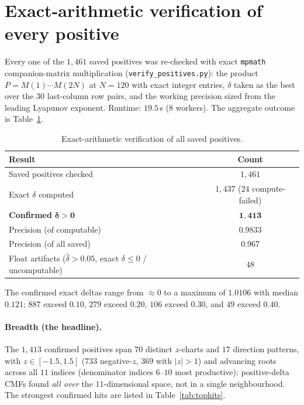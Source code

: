 \documentclass[11pt,a4paper]{article}
\theoremstyle{definition}
\newcommand{\dhat}{\hat{\delta}}
\begin{document}
\section{Exact-arithmetic verification of every positive}
\label{sec:exact}
Every one of the $1{,}461$ saved positives was re-checked with exact \texttt{mpmath}
companion-matrix multiplication (\texttt{verify\_positives.py}): the product
$P=M(1)\cdots M(2N)$ at $N=120$ with exact integer entries, $\delta$ taken as the best over the
$30$ last-column row pairs, and the working precision sized from the leading Lyapunov exponent.
Runtime: $19.5$\,s ($8$ workers). The aggregate outcome is Table~\ref{tab:verify}.

\begin{table}[t]\centering
\caption{Exact-arithmetic verification of all saved positives.}
\label{tab:verify}
\begin{tabular}{lc}
\toprule
Result & Count \\
\midrule
Saved positives checked & $1{,}461$ \\
Exact $\delta$ computed & $1{,}437$ ($24$ compute-failed) \\
\textbf{Confirmed }$\boldsymbol{\delta>0}$ & $\mathbf{1{,}413}$ \\
Precision (of computable) & $\mathbf{0.9833}$ \\
Precision (of all saved) & $0.967$ \\
Float artifacts ($\dhat>0.05$, exact $\delta\le0$ / uncomputable) & $48$ \\
\bottomrule
\end{tabular}
\end{table}

The confirmed exact deltas range from ${\approx}0$ to a maximum of $1.0106$ with median
$0.121$; $887$ exceed $0.10$, $279$ exceed $0.20$, $106$ exceed $0.30$, and $49$ exceed $0.40$.
\paragraph{Breadth (the headline).} The $1{,}413$ confirmed positives span $70$ distinct
$z$-charts and $17$ direction patterns, with $z\in[-1.5,1.5]$ ($733$ negative-$z$, $369$ with
$|z|>1$) and advancing roots across all $11$ indices (denominator indices $6$--$10$ most
productive): positive-delta CMFs found \emph{all over} the $11$-dimensional space, not in a
single neighbourhood. The strongest confirmed hits are listed in Table~\ref{tab:tophits}.
\end{document}
